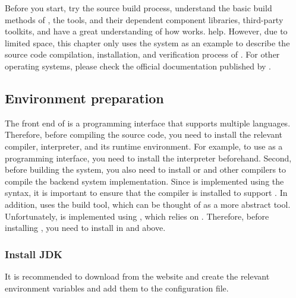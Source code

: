 \begin{content}

Before you start, try the \tf{} source build process, understand the basic build methods of \tf{}, the tools, and their dependent component libraries, third-party toolkits, and have a great understanding of how \tf{} works. help. However, due to limited space, this chapter only uses the  system as an example to describe the source code compilation, installation, and verification process of \tf{}. For other operating systems, please check the official documentation published by \tf{}.

\subsection{Environment preparation}

The front end of  is a programming interface that supports multiple languages. Therefore, before compiling the  source code, you need to install the relevant compiler, interpreter, and its runtime environment. For example, to use  as a programming interface, you need to install the  interpreter beforehand. Second, before building the system, you also need to install  or  and other  compilers to compile the backend system implementation. Since  is implemented using the  syntax, it is important to ensure that the  compiler is installed to support . In addition,  uses the  build tool, which can be thought of as a more abstract  tool. Unfortunately,  is implemented using , which relies on . Therefore, before installing , you need to install  in  and above.

\subsubsection{Install JDK}

It is recommended to download  from the  website and create the relevant environment variables and add them to the  configuration file.



\end{content}
